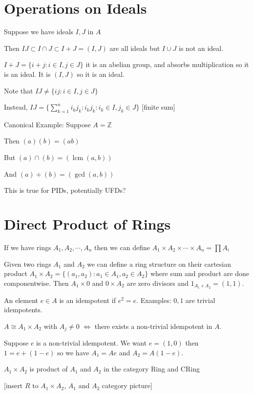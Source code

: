 \documentclass{article}
\theoremstyle{definition}
\begin{document}
\section*{Operations on Ideals}

Suppose we have ideals \(I,J\) in \(A\) 

Then \(IJ \subset I \cap J \subset I + J = (I,J)\) are all ideals but \(I \cup J\) is not an ideal.

\(I+J = \{ i + j : i\in I, j\in J \} \) it is an abelian group, and absorbs multiplication so it is an ideal. It is \((I,J)\) so it is an ideal.

Note that \(IJ \neq \{ ij : i\in I, j\in J \} \) 

Instead, \(IJ = \{ \sum_{k=1}^n i_k j_k : i_k j_k : i_k \in I, j_k\in J \} \) [finite sum]

Canonical Example: Suppose \(A = \mathbb{Z}\) 

Then \((a)(b)=(ab)\) 

But \((a)\cap (b)=(\operatorname{lcm}(a,b) )\) 

And \((a)+(b)=(\gcd(a,b))\) 

This is true for PIDs, potentially UFDs?

\section*{Direct Product of Rings}

If we have rings \(A_1, A_2,\cdots, A_n\) then we can define \(A_1 \times A_2 \times \cdots \times A_n = \prod A_i\) 

Given two rings \(A_1\) and \(A_2\) we can define a ring structure on their cartesian product \(A_1 \times A_2 = \{ (a_1,a_2) : a_1\in A_1, a_2\in A_2 \} \) where sum and product are done componentwise. Then \(A_1 \times 0\) and \(0\times A_2\) are zero divisors and \(1_{A_1\times A_2}=(1,1)\).

An element \(e\in A\) is an idempotent if \(e^2 = e\). Examples: \(0,1\) are trivial idempotents.

\(A \cong A_1 \times A_2\) with \(A_j \neq 0\) \(\iff \) there exists a non-trivial idempotent in \(A\).

Suppose \(e\) is a non-trivial idempotent. We want \(e=(1,0)\) then \(1 = e + (1-e)\) so we have \(A_1 = Ae\) and \(A_2 = A(1-e)\).

\(A_1 \times A_2\) is product of \(A_1\) and \(A_2\) in the category Ring and CRing

[insert \(R\) to \(A_1\times A_2\), \(A_1\) and \(A_2\) category picture]
\end{document}
